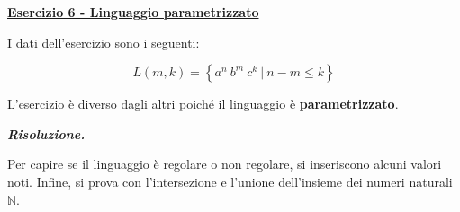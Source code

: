 \documentclass[a4paper]{article}
\begin{document}
	\newpage
	
	\noindent
	\textcolor{Red3}{\textbf{\underline{Esercizio 6 - Linguaggio parametrizzato}}}\newline
	
	\noindent
	I dati dell'esercizio sono i seguenti:
	
	\begin{equation*}
		L\left(m,k\right) = \left\{a^{n} \: b^{m} \: c^{k} \: \left| \: n-m \le k \right.\right\}
	\end{equation*}\newline

	\noindent
	L'esercizio è diverso dagli altri poiché il linguaggio è \textbf{\underline{parametrizzato}}.\newline
	
	\noindent
	\textcolor{Green4}{\textbf{\emph{Risoluzione.}}}\newline
	
	\noindent
	Per capire se il linguaggio è regolare o non regolare, si inseriscono alcuni valori noti. Infine, si prova con l'intersezione e l'unione dell'insieme dei numeri naturali $\mathbb{N}$.
	
\end{document}
